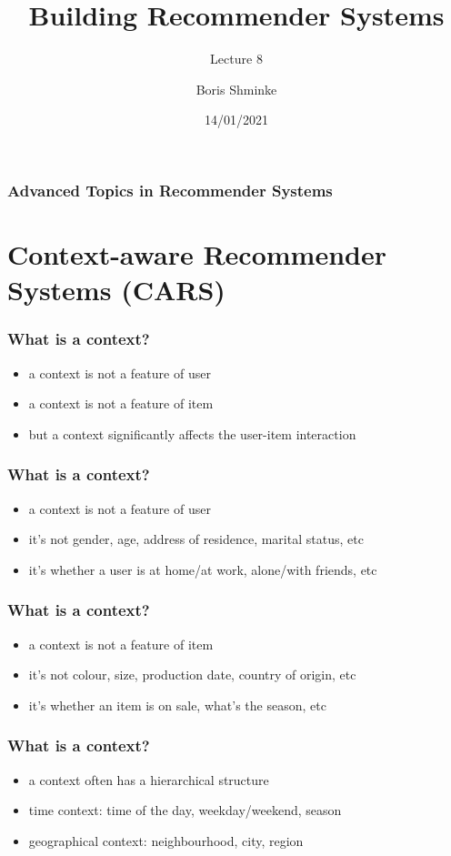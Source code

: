 \documentclass{beamer}
\title{Building Recommender Systems}
\subtitle{Lecture 8}
\author{Boris Shminke}
\institute{Université Côte d'Azur, CNRS, LJAD, France}
\date{14/01/2021}
\begin{document}
\begin{frame}
  \titlepage  
\end{frame}  
\begin{frame}
  \frametitle{Advanced Topics in Recommender Systems}
  \tableofcontents
\end{frame}
\section{Context-aware Recommender Systems (CARS)}
\begin{frame}
  \frametitle{What is a context?}
  \begin{itemize}
  \item a context is not a feature of user
  \item a context is not a feature of item
  \item but a context significantly affects the user-item interaction
  \end{itemize}
\end{frame}
\begin{frame}
  \frametitle{What is a context?}
  \begin{itemize}
  \item a context is not a feature of user
  \item it's not gender, age, address of residence, marital status, etc
  \item it's whether a user is at home/at work, alone/with friends, etc
  \end{itemize}
\end{frame}
\begin{frame}
  \frametitle{What is a context?}
  \begin{itemize}
  \item a context is not a feature of item
  \item it's not colour, size, production date, country of origin, etc
  \item it's whether an item is on sale, what's the season, etc
  \end{itemize}
\end{frame}
\begin{frame}
  \frametitle{What is a context?}
  \begin{itemize}
  \item a context often has a hierarchical structure
  \item time context: time of the day, weekday/weekend, season
  \item geographical context: neighbourhood, city, region
  \end{itemize}
\end{frame}
\end{document}
